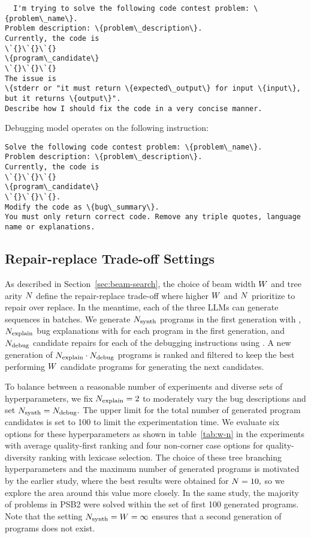 \begin{lstlisting}
  I'm trying to solve the following code contest problem: \{problem\_name\}. 
Problem description: \{problem\_description\}.
Currently, the code is 
\`{}\`{}\`{}
\{program\_candidate\}
\`{}\`{}\`{}
The issue is 
\{stderr or "it must return \{expected\_output\} for input \{input\}, but it returns \{output\}".
Describe how I should fix the code in a very concise manner.
\end{lstlisting}

Debugging model \debugmodel{} operates on the following instruction:

\begin{lstlisting}
Solve the following code contest problem: \{problem\_name\}.
Problem description: \{problem\_description\}.
Currently, the code is 
\`{}\`{}\`{}
\{program\_candidate\}
\`{}\`{}\`{}.
Modify the code as \{bug\_summary\}.
You must only return correct code. Remove any triple quotes, language name or explanations.
\end{lstlisting}


\newpage \subsection{Repair-replace Trade-off Settings}
\label{sec:trade-off-settings}

As described in Section~\ref{sec:beam-search}, the choice of beam width $W{}$ and tree arity $N{}$ define the repair-replace trade-off where higher $W{}$ and $N{}$ prioritize to repair over replace. 
In the meantime, each of the three LLMs can generate sequences in batches. 
We generate $N_\text{synth}{}$ programs in the first generation with \synthmodel{}, $N_\text{explain}{}$ bug explanations with \textmodel{} for each program in the first generation, and $N_\text{debug}{}$ candidate repairs for each of the debugging instructions using \debugmodel{}.
A new generation of $N_\text{explain}{} \cdot N_\text{debug}{}$ programs is ranked and filtered to keep the best performing $W{}$ candidate programs for generating the next candidates. 

To balance between a reasonable number of experiments and diverse sets of hyperparameters, we fix $N_\text{explain}{}=2$ to moderately vary the bug descriptions and set $N_\text{synth}{} = N_\text{debug}{}.$
The upper limit for the total number of generated program candidates is set to 100 to limit the experimentation time. 
We evaluate six options for these hyperparameters as shown in table~\ref{tab:w-n} in the experiments with average quality-first ranking and four non-corner case options for quality-diversity ranking with lexicase selection. 
The choice of these tree branching hyperparameters and the maximum number of generated programs is motivated by the earlier study, where the best results were obtained for $N{}=10,$ so we explore the area around this value more closely.
In the same study, the majority of problems in PSB2 were solved within the set of first 100 generated programs. Note that the setting $N_\text{synth}{}=W{}=\infty$ ensures that a second generation of programs does not exist.

